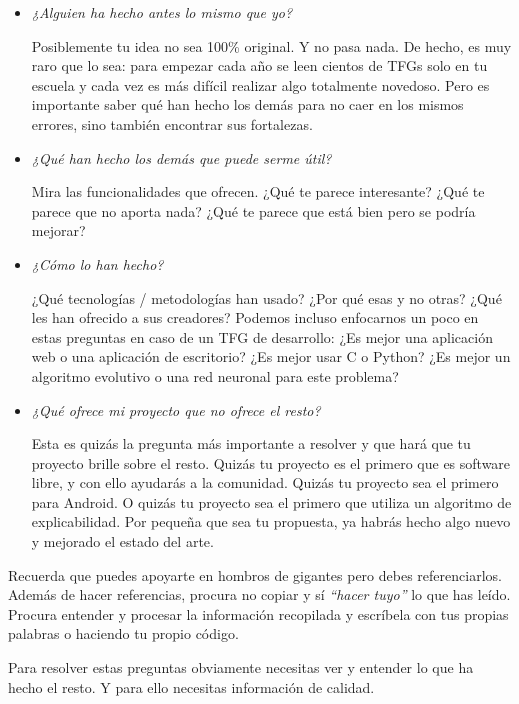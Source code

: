 \begin{itemize}
    \item \textit{¿Alguien ha hecho antes lo mismo que yo?}
    
Posiblemente tu idea no sea 100\% original. Y no pasa nada. De hecho, es muy raro que lo sea: para empezar cada año se leen cientos de TFGs solo en tu escuela y cada vez es más difícil realizar algo totalmente novedoso. Pero es importante saber qué han hecho los demás para no caer en los mismos errores, sino también encontrar sus fortalezas.

\item \textit{¿Qué han hecho los demás que puede serme útil?}

Mira las funcionalidades que ofrecen. ¿Qué te parece interesante? ¿Qué te parece que no aporta nada? ¿Qué te parece que está bien pero se podría mejorar?

\item \textit{¿Cómo lo han hecho?} 

¿Qué tecnologías / metodologías han usado? ¿Por qué esas y no otras? ¿Qué les han ofrecido a sus creadores? Podemos incluso enfocarnos un poco en estas preguntas en caso de un TFG de desarrollo: ¿Es mejor una aplicación web o una aplicación de escritorio? ¿Es mejor usar C o Python? ¿Es mejor un algoritmo evolutivo o una red neuronal para este problema?

\item \textit{¿Qué ofrece mi proyecto que no ofrece el resto?} 

Esta es quizás la pregunta más importante a resolver y que hará que tu proyecto brille sobre el resto. Quizás tu proyecto es el primero que es software libre, y con ello ayudarás a la comunidad. Quizás tu proyecto sea el primero para Android. O quizás tu proyecto sea el primero que utiliza un algoritmo de explicabilidad. Por pequeña que sea tu propuesta, ya habrás hecho algo nuevo y mejorado el estado del arte.

\end{itemize}

Recuerda que puedes apoyarte en hombros de gigantes pero debes referenciarlos. Además de hacer referencias, procura no copiar y sí {\it ``hacer tuyo''} lo que has leído. Procura entender y procesar la información recopilada y escríbela con tus propias palabras o haciendo tu propio código.

Para resolver estas preguntas obviamente necesitas ver y entender lo que ha hecho el resto. Y para ello necesitas información de calidad.

